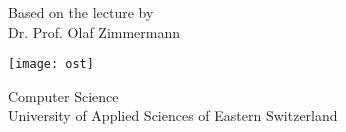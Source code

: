 \begin{titlepage}
    \begin{center}
        \vspace*{1cm}
            
        \Huge
        \textbf{\SUBJECT}
            
        \vspace{0.5cm}
        \LARGE
        \SEMESTER
            
        \vspace{1.5cm}
            
        \textbf{\STUDENT} 
        \vspace{0.5cm}
         
        \Large
        Based on the lecture by\\
       	Dr. Prof. Olaf Zimmermann
       
        \vfill

    
        \texttt{[image: ost]}
           
        \vspace{2cm}
           
        
        Computer Science \\
        University of Applied Sciences of Eastern Switzerland
        

    \end{center}
\end{titlepage}

\pagebreak